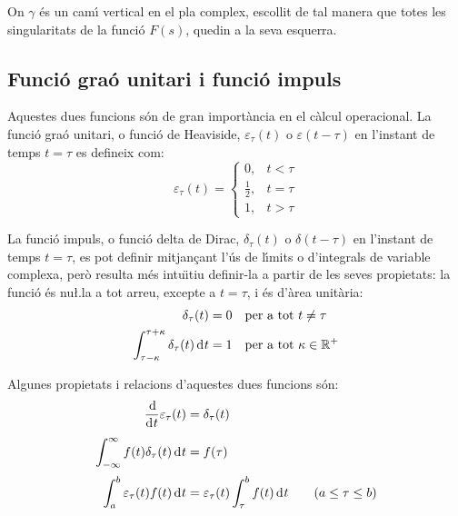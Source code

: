 On $\gamma$ \'{e}s un cam\'{\i} vertical en el pla complex, escollit de tal
manera que totes les singularitats de la funci\'{o} $F(s)$, quedin a la
seva esquerra.

\subsection{Funci\'{o} gra\'{o} unitari i funci\'{o} impuls} 

Aquestes dues funcions s\'{o}n de gran import\`{a}ncia en el c\`{a}lcul
operacional. La funci\'{o} gra\'{o} unitari, o funci\'{o} de Heaviside,
$\varepsilon_\tau(t)$ o $\varepsilon(t-\tau)$ en l'instant de temps
$t=\tau$ es defineix com:
\begin{equation}
    \varepsilon_\tau(t) = \begin{cases} 0, & t < \tau \\ \frac{1}{2}, & t = \tau \\ 1, & t > \tau \end{cases}
\end{equation}

La funci\'{o} impuls, o funci\'{o} delta de Dirac, $\delta_\tau(t)$ o
$\delta(t-\tau)$ en l'instant de temps $t=\tau$, es pot definir
mitjan\c{c}ant l'\'{u}s de l\'{\i}mits o d'integrals de variable complexa, per\`{o}
resulta m\'{e}s intu\"{\i}tiu definir-la a partir de les seves propietats: la
funci\'{o} \'{e}s nu{\l.l}a a tot arreu, excepte a $t=\tau$, i \'{e}s d'\`{a}rea
unit\`{a}ria:
\begin{subequations}
\begin{align}
    \delta_\tau(t) &= 0 \quad \text{per a tot } t \neq \tau \\
    \int_{\tau-\kappa}^{\tau+\kappa} \delta_\tau(t) \diff t &= 1 \quad \text{per a tot }
     \kappa \in \mathbb{R^+}
\end{align}
\end{subequations}

Algunes propietats i relacions d'aquestes dues funcions s\'{o}n:
\begin{align}
   \frac{\diff}{\diff t} \varepsilon_\tau (t) &= \delta_\tau(t) \\[0.5ex]
   \int_{-\infty}^\infty f(t) \delta_\tau (t) \diff t &= f(\tau) \\[0.5ex]
    \int_a^b \varepsilon_\tau (t) f(t) \diff t &= \varepsilon_\tau(t)
    \int_\tau^b f(t) \diff t \qquad (a\leq\tau\leq b)
\end{align}

